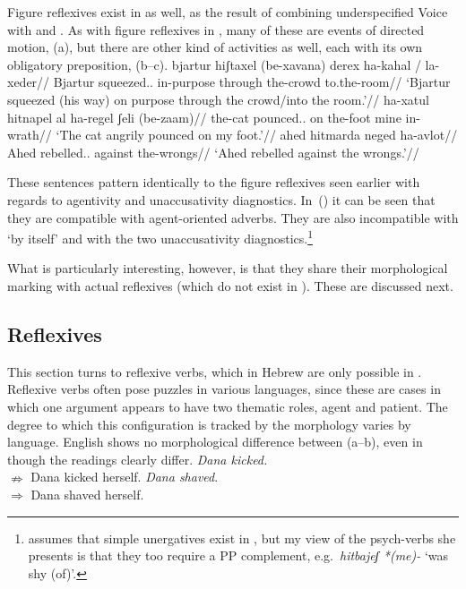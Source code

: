 Figure reflexives exist in {\thit} as well, as the result of combining underspecified Voice with {\va} and {\pz}. As with figure reflexives in {\tnif}, many of these are events of directed motion, (\nextx a), but there are other kind of activities as well, each with its own obligatory preposition, (\nextx b--c).
\pex
	\a \begingl
		\gla bjartur hiʃtaxel (be-xavana) derex ha-kahal / la-xeder//
		\glb Bjartur squeezed.. in-purpose through the-crowd {} to.the-room//
		\glft `Bjartur squeezed (his way) on purpose through the crowd/into the room.'//
		\endgl
	\a \begingl
		\gla ha-xatul hitnapel al ha-regel ʃeli (be-zaam)//
		\glb the-cat pounced.. on the-foot mine in-wrath//
		\glft `The cat angrily pounced on my foot.'//
		\endgl
	\a \begingl
		\gla ahed hitmarda neged ha-avlot//
		\glb Ahed rebelled.. against the-wrongs//
		\glft `Ahed rebelled against the wrongs.'//
		\endgl
\xe

These sentences pattern identically to the figure reflexives seen earlier with regards to agentivity and unaccusativity diagnostics. In~(\lastx) it can be seen that they are compatible with agent-oriented adverbs. They are also incompatible with `by itself' and with the two unaccusativity diagnostics.\footnote{\cite{siloni08} assumes that simple unergatives exist in {\thit}, but my view of the psych-verbs she presents is that they too require a PP complement, e.g.~\emph{hitbajeʃ *(me)-} `was shy (of)'.}

What is particularly interesting, however, is that they share their morphological marking with actual reflexives (which do not exist in {\tnif}). These are discussed next.


	\subsection{Reflexives} \label{vz:thit:refl}
This section turns to reflexive verbs, which in Hebrew are only possible in {\thit}. Reflexive verbs often pose puzzles in various languages, since these are cases in which one argument appears to have two thematic roles, agent and patient. The degree to which this configuration is tracked by the morphology varies by language. English shows no morphological difference between (\nextx a--b), even in though the readings clearly differ.
\pex \a \emph{Dana kicked.}\\
		$\nRightarrow$ Dana kicked herself.
	\a \emph{Dana shaved}.\\
		$\Rightarrow$ Dana shaved herself.
\xe

